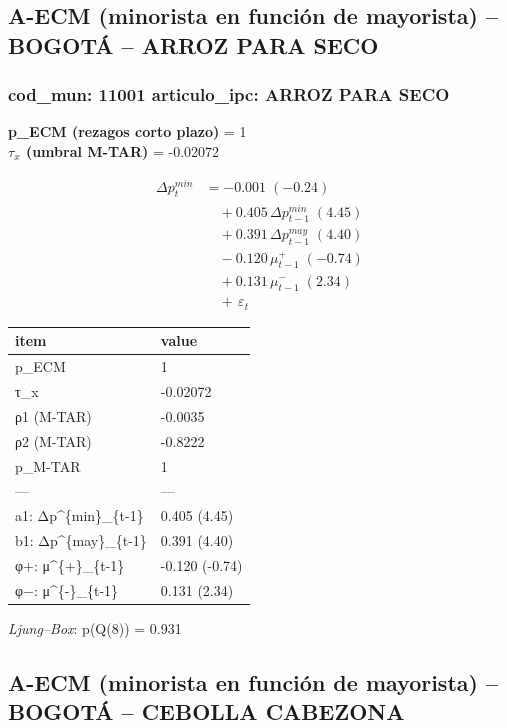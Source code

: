 \documentclass[
  12pt,
]{article}
\begin{document}
\subsection{A-ECM (minorista en función de mayorista) -- BOGOTÁ -- ARROZ
PARA
SECO}\label{a-ecm-minorista-en-funciuxf3n-de-mayorista-bogotuxe1-arroz-para-seco}

\subsubsection{cod\_mun: 11001 \textbar{} articulo\_ipc: ARROZ PARA
SECO}\label{cod_mun-11001-articulo_ipc-arroz-para-seco}

\textbf{p\_ECM (rezagos corto plazo)} = 1\\
\textbf{\(\tau_x\) (umbral M-TAR)} = -0.02072

\[
\begin{aligned}
\Delta p^{min}_{t} &= -0.001\;(-0.24) \\
&\quad + 0.405\,\Delta p^{min}_{t-1}\;(4.45) \\
&\quad + 0.391\,\Delta p^{may}_{t-1}\;(4.40) \\
&\quad − 0.120\,\mu^{+}_{t-1}\;(-0.74) \\
&\quad + 0.131\,\mu^{-}_{t-1}\;(2.34) \\
&\quad +\, \varepsilon_t
\end{aligned}
\]

\begin{longtable}[t]{ll}
\toprule
item & value\\
\midrule
p\_ECM & 1\\
τ\_x & -0.02072\\
ρ1 (M-TAR) & -0.0035\\
ρ2 (M-TAR) & -0.8222\\
p\_M-TAR & 1\\
\addlinespace
— & —\\
a1: Δp\textasciicircum{}\{min\}\_\{t-1\} & 0.405 (4.45)\\
b1: Δp\textasciicircum{}\{may\}\_\{t-1\} & 0.391 (4.40)\\
φ+: μ\textasciicircum{}\{+\}\_\{t-1\} & -0.120 (-0.74)\\
φ−: μ\textasciicircum{}\{-\}\_\{t-1\} & 0.131 (2.34)\\
\bottomrule
\end{longtable}

\emph{Ljung--Box}: p(Q(8)) = 0.931

\subsection{A-ECM (minorista en función de mayorista) -- BOGOTÁ --
CEBOLLA
CABEZONA}\label{a-ecm-minorista-en-funciuxf3n-de-mayorista-bogotuxe1-cebolla-cabezona}
\end{document}
